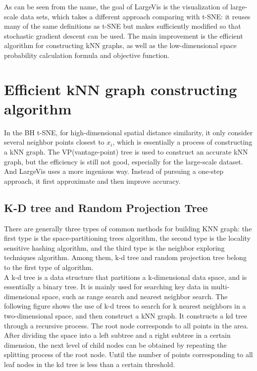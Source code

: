 \noindent As can be seen from the name, the goal of LargeVis\cite{ref5} is the visualization of large-scale data sets, which takes a different approach comparing with t-SNE: it reuses many of the same definitions as t-SNE but makes sufficiently modified so that stochastic gradient descent can be used. The main improvement is the efficient algorithm for constructing kNN graphs, as well as the low-dimensional space probability calculation formula and objective function.

\section{Efficient kNN graph constructing algorithm}

In the BH t-SNE, for high-dimensional spatial distance similarity, it only consider several neighbor points closest to $x_i$, which is essentially a process of constructing a kNN graph. The VP(vantage-point) tree is used to construct an accurate kNN graph, but the efficiency is still not good, especially for the large-scale dataset. And LargeVis uses a more ingenious way. Instead of pursuing a one-step approach, it first approximate and then improve accuracy.\\

\subsection{K-D tree and Random Projection Tree}

There are generally three types of common methods for building KNN graph: the first type is the space-partitioning trees algorithm, the second type is the locality sensitive hashing algorithm, and the third type is the neighbor exploring techniques algorithm. Among them, k-d tree and random projection tree belong to the first type of algorithm.\\

\noindent A k-d tree is a data structure that partitions a k-dimensional data space, and is essentially a binary tree. It is mainly used for searching key data in multi-dimensional space, such as range search and nearest neighbor search. The following figure shows the use of k-d trees to search for k nearest neighbors in a two-dimensional space, and then construct a kNN graph. It constructs a kd tree through a recursive process. The root node corresponds to all points in the area. After dividing the space into a left subtree and a right subtree in a certain dimension, the next level of child nodes can be obtained by repeating the splitting process of the root node. Until the number of points corresponding to all leaf nodes in the kd tree is less than a certain threshold.\\

